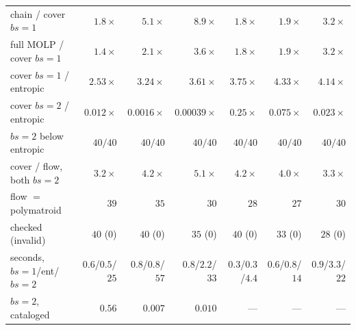 \documentclass[conference]{IEEEtran}
\begin{document}
\begin{table}[t]
\begin{tabular}{@{}lrrrrrr@{}}
chain / cover $bs{=}1$ & $1.8\times$ & $5.1\times$ & $8.9\times$ & $1.8\times$ & $1.9\times$ & $3.2\times$ \\
full MOLP / cover $bs{=}1$ & $1.4\times$ & $2.1\times$ & $3.6\times$ & $1.8\times$ & $1.9\times$ & $3.2\times$ \\
cover $bs{=}1$ / entropic & $2.53\times$ & $3.24\times$ & $3.61\times$ & $3.75\times$ & $4.33\times$ & $4.14\times$ \\
cover $bs{=}2$ / entropic & $0.012\times$ & $0.0016\times$ & $0.00039\times$ & $0.25\times$ & $0.075\times$ & $0.023\times$ \\
$bs{=}2$ below entropic & $40/40$ & $40/40$ & $40/40$ & $40/40$ & $40/40$ & $40/40$ \\
cover / flow, both $bs{=}2$ & $3.2\times$ & $4.2\times$ & $5.1\times$ & $4.2\times$ & $4.0\times$ & $3.3\times$ \\
flow $=$ polymatroid & $39$ & $35$ & $30$ & $28$ & $27$ & $30$ \\
checked (invalid) & $40$ ($0$) & $40$ ($0$) & $35$ ($0$) & $40$ ($0$) & $33$ ($0$) & $28$ ($0$) \\
seconds, $bs{=}1$/ent/$bs{=}2$ & $0.6$/$0.5$/$25$ & $0.8$/$0.8$/$57$ & $0.8$/$2.2$/$33$ & $0.3$/$0.3$/$4.4$ & $0.6$/$0.8$/$14$ & $0.9$/$3.3$/$22$ \\
$bs{=}2$, cataloged & $0.56$ & $0.007$ & $0.010$ & --- & --- & --- \\
\bottomrule
\end{tabular}
\end{table}
\end{document}
